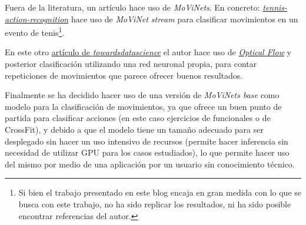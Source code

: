 Fuera de la literatura, un artículo hace uso de \textit{MoViNets}.
En concreto: \href{https://blog.ml6.eu/sports-video-analysis-in-the-real-world-realtime-tennis-action-recognition-using-movinet-stream-813200aa589f}{\textit{tennis-action-recognition}} hace uso de \textit{MoViNet stream} para clasificar movimientos en un evento de tenis\footnote{Si bien el trabajo presentado en este blog encaja en gran medida con lo que se busca con este trabajo, no ha sido replicar los resultados, ni ha sido posible encontrar referencias del autor.}.

En este otro \href{https://towardsdatascience.com/how-i-created-the-workout-movement-counting-app-using-deep-learning-and-optical-flow-89f9d2e087ac}{artículo de \textit{towardsdatascience}} el autor hace uso de \href{https://docs.opencv.org/3.4/d4/dee/tutorial_optical_flow.html}{\textit{Optical Flow}} y posterior clasificación utilizando una red neuronal propia, para contar repeticiones de movimientos que parece ofrecer buenos resultados.

Finalmente se ha decidido hacer uso de una versión de \textit{MoViNets base} como modelo para la clasificación de movimientos, ya que ofrece un buen punto de partida para clasificar acciones (en este caso ejercicios de funcionales o de CrossFit), y debido a que el modelo tiene un tamaño adecuado para ser desplegado sin hacer un uso intensivo de recursos (permite hacer inferencia sin necesidad de utilizar GPU para los casos estudiados), lo que permite hacer uso del mismo por medio de una aplicación por un usuario sin conocimiento técnico.

